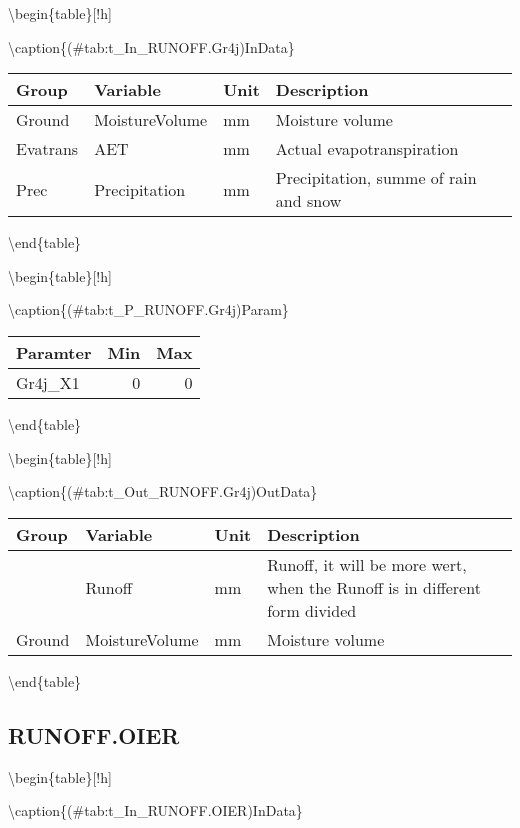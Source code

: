 \documentclass[
]{book}
\begin{document}
\textbackslash begin\{table\}{[}!h{]}

\textbackslash caption\{(\#tab:t\_In\_RUNOFF.Gr4j)InData\}
\centering

\begin{tabular}[t]{l|l|l|l}
\hline
Group & Variable & Unit & Description\\
\hline
Ground & MoistureVolume & mm & Moisture volume\\
\cline{1-4}
Evatrans & AET & mm & Actual evapotranspiration\\
\cline{1-4}
Prec & Precipitation & mm & Precipitation, summe of rain and snow\\
\hline
\end{tabular}

\textbackslash end\{table\}

\textbackslash begin\{table\}{[}!h{]}

\textbackslash caption\{(\#tab:t\_P\_RUNOFF.Gr4j)Param\}
\centering

\begin{tabular}[t]{l|r|r}
\hline
Paramter & Min & Max\\
\hline
Gr4j\_X1 & 0 & 0\\
\hline
\end{tabular}

\textbackslash end\{table\}

\textbackslash begin\{table\}{[}!h{]}

\textbackslash caption\{(\#tab:t\_Out\_RUNOFF.Gr4j)OutData\}
\centering

\begin{tabular}[t]{l|l|l|l}
\hline
Group & Variable & Unit & Description\\
\hline
 & Runoff & mm & Runoff, it will be more wert, when the Runoff is in different form divided\\
\cline{2-4}
\multirow{-2}{*}{\raggedright\arraybackslash Ground} & MoistureVolume & mm & Moisture volume\\
\hline
\end{tabular}

\textbackslash end\{table\}

\hypertarget{runoff.oier}{%
\subsection{RUNOFF.OIER}\label{runoff.oier}}

\textbackslash begin\{table\}{[}!h{]}

\textbackslash caption\{(\#tab:t\_In\_RUNOFF.OIER)InData\}
\centering
\end{document}

